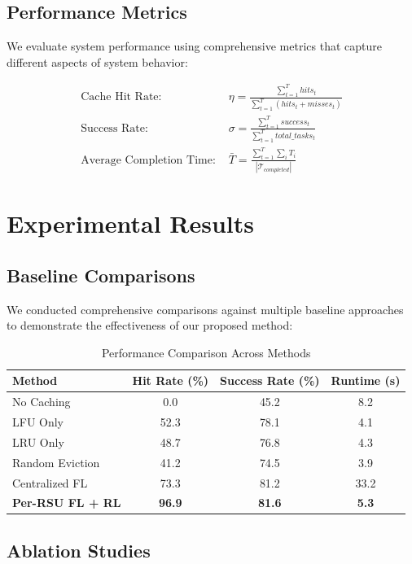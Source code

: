 \documentclass[11pt]{article}
\begin{document}
\subsection{Performance Metrics}

We evaluate system performance using comprehensive metrics that capture different aspects of system behavior:

\begin{align}
\text{Cache Hit Rate: } & \eta = \frac{\sum_{t=1}^{T} hits_t}{\sum_{t=1}^{T} (hits_t + misses_t)} \\
\text{Success Rate: } & \sigma = \frac{\sum_{t=1}^{T} success_t}{\sum_{t=1}^{T} total\_tasks_t} \\
\text{Average Completion Time: } & \bar{T} = \frac{\sum_{t=1}^{T} \sum_{i} T_i}{|\mathcal{T}_{completed}|}
\end{align}

\section{Experimental Results}

\subsection{Baseline Comparisons}

We conducted comprehensive comparisons against multiple baseline approaches to demonstrate the effectiveness of our proposed method:

\begin{table}[h]
\centering
\begin{tabular}{@{}lccc@{}}
\toprule
Method & Hit Rate (\%) & Success Rate (\%) & Runtime (s) \\
\midrule
No Caching & 0.0 & 45.2 & 8.2 \\
LFU Only & 52.3 & 78.1 & 4.1 \\
LRU Only & 48.7 & 76.8 & 4.3 \\
Random Eviction & 41.2 & 74.5 & 3.9 \\
Centralized FL & 73.3 & 81.2 & 33.2 \\
\textbf{Per-RSU FL + RL} & \textbf{96.9} & \textbf{81.6} & \textbf{5.3} \\
\bottomrule
\end{tabular}
\caption{Performance Comparison Across Methods}
\end{table}

\subsection{Ablation Studies}
\end{document}
